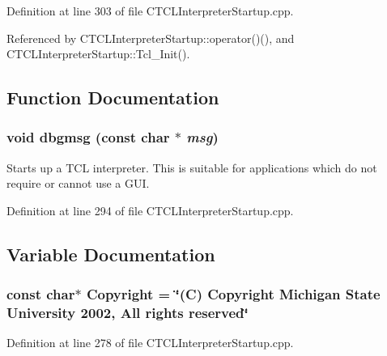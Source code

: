 Definition at line 303 of file CTCLInterpreter\-Startup.cpp.

Referenced by CTCLInterpreter\-Startup::operator()(), and CTCLInterpreter\-Startup::Tcl\_\-Init().

\subsection{Function Documentation}
\subsubsection{\setlength{\rightskip}{0pt plus 5cm}void dbgmsg (const char $\ast$ {\em msg})\hspace{0.3cm}{\tt  [inline, static]}}\label{CTCLInterpreterStartup_8cpp_a2}


Starts up a TCL interpreter. This is suitable for applications which do not require or cannot use a GUI. 

Definition at line 294 of file CTCLInterpreter\-Startup.cpp.

\subsection{Variable Documentation}
\subsubsection{\setlength{\rightskip}{0pt plus 5cm}const char$\ast$ Copyright = \char`\"{}(C) Copyright Michigan State University 2002, All rights reserved\char`\"{}\hspace{0.3cm}{\tt  [static]}}\label{CTCLInterpreterStartup_8cpp_a1}




Definition at line 278 of file CTCLInterpreter\-Startup.cpp.